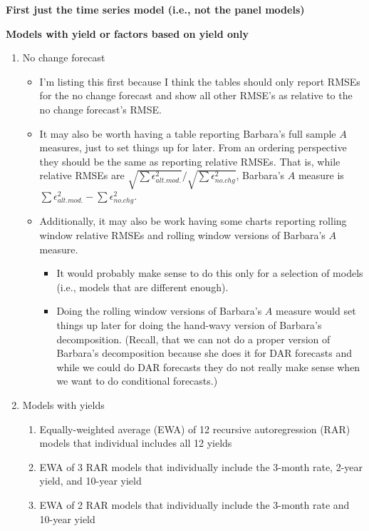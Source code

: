 \documentclass[11pt]{article}
\begin{document}
\noindent

\textbf{First just the time series model (i.e., not the panel models)}

\textbf{Models with yield or factors based on yield only}

\begin{enumerate}
\item No change forecast 
\begin{itemize}
\item I'm listing this first because I think the tables should only report RMSEs for the no change forecast and show all other RMSE's as relative to the no change forecast's RMSE.  
\item It may also be worth having a table reporting Barbara's full sample $A$ measures, just to set things up for later.  From an ordering perspective they should be the same as reporting relative RMSEs.  That is, while relative RMSEs are $\sqrt{\sum \epsilon^{2}_{alt.mod.}}/\sqrt{\sum \epsilon^{2}_{no.chg}}$, Barbara's $A$ measure is  $\sum \epsilon^{2}_{alt.mod.}-\sum \epsilon^{2}_{no.chg}$.
\item Additionally, it may also be work having some charts reporting rolling window relative RMSEs and rolling window versions of Barbara's $A$ measure.  
\begin{itemize}
\item It would probably make sense to do this only for a selection of models (i.e., models that are different enough).  
\item Doing the rolling window versions of Barbara's $A$ measure would set things up later for doing the hand-wavy version of Barbara's decomposition. (Recall, that we can not do a proper version of Barbara's decomposition because she does it for DAR forecasts and while we could do DAR forecasts they do not really make sense when we want to do conditional forecasts.)  
\end{itemize}
\end{itemize}
\item Models with yields
\begin{enumerate}
\item Equally-weighted average (EWA) of 12 recursive autoregression (RAR) models that individual includes all 12 yields 
\item EWA of 3 RAR models that individually include the 3-month rate, 2-year yield, and 10-year yield
\item EWA of 2 RAR models that individually include the 3-month rate and 10-year yield
\end{enumerate}

\end{enumerate}
\end{document}
